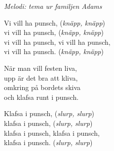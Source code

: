 {\footnotesize\textit{Melodi: tema ur familjen Adams}}\par
\vspace{10pt}
Vi vill ha punsch, (\textit{knäpp, knäpp})\\
vi vill ha punsch, (\textit{knäpp, knäpp})\\
vi vill ha punsch, vi vill ha punsch,\\
vi vill ha punsch. (\textit{knäpp, knäpp})\par
\vspace{10pt}
När man vill festen liva,\\
upp är det bra att kliva,\\
omkring på bordets skiva\\
och klafsa runt i punsch.\par
\vspace{10pt}
Klafsa i punsch, (\textit{slurp, slurp})\\
klafsa i punsch, (\textit{slurp, slurp})\\
klafsa i punsch, klafsa i punsch,\\
klafsa i punsch. (\textit{slurp, slurp})
